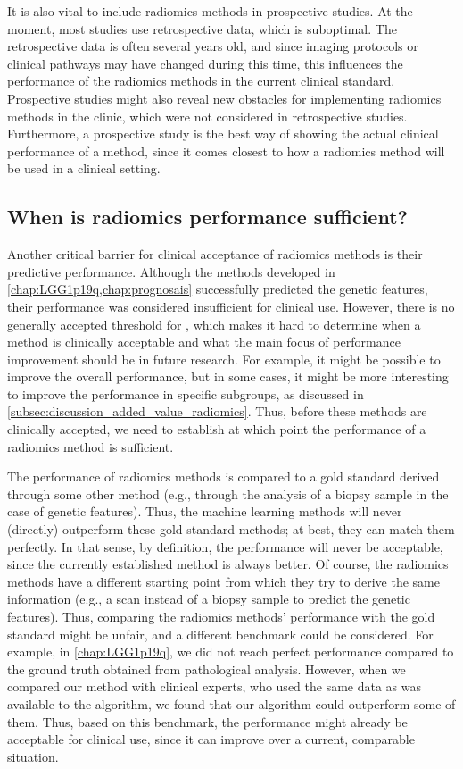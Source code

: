 It is also vital to include radiomics methods in prospective studies.
At the moment, most studies use retrospective data, which is suboptimal.
The retrospective data is often several years old, and since imaging protocols or clinical pathways may have changed during this time, this influences the performance of the radiomics methods in the current clinical standard.
Prospective studies might also reveal new obstacles for implementing radiomics methods in the clinic, which were not considered in retrospective studies.
Furthermore, a prospective study is the best way of showing the actual clinical performance of a method, since it comes closest to how a radiomics method will be used in a clinical setting.

\subsection{When is radiomics performance sufficient?}\label{subsec:discussion_radiomics_performance}

Another critical barrier for clinical acceptance of radiomics methods is their predictive performance.
Although the methods developed in \cref{chap:LGG1p19q,chap:prognosais} successfully predicted the genetic features, their performance was considered insufficient for clinical use.
However, there is no generally accepted threshold for , which makes it hard to determine when a method is clinically acceptable and what the main focus of performance improvement should be in future research.
For example, it might be possible to improve the overall performance, but in some cases, it might be more interesting to improve the performance in specific subgroups, as discussed in \cref{subsec:discussion_added_value_radiomics}.
Thus, before these methods are clinically accepted, we need to establish at which point the performance of a radiomics method is sufficient.

The performance of radiomics methods is compared to a gold standard derived through some other method (e.g., through the analysis of a biopsy sample in the case of genetic features).
Thus, the machine learning methods will never (directly) outperform these gold standard methods; at best, they can match them perfectly.
In that sense, by definition, the performance will never be acceptable, since the currently established method is always better.
Of course, the radiomics methods have a different starting point from which they try to derive the same information (e.g., a scan instead of a biopsy sample to predict the genetic features).
Thus, comparing the radiomics methods' performance with the gold standard might be unfair, and a different benchmark could be considered.
For example, in \cref{chap:LGG1p19q}, we did not reach perfect performance compared to the ground truth obtained from pathological analysis.
However, when we compared our method with clinical experts, who used the same data as was available to the algorithm, we found that our algorithm could outperform some of them.
Thus, based on this benchmark, the performance might already be acceptable for clinical use, since it can improve over a current, comparable situation.

